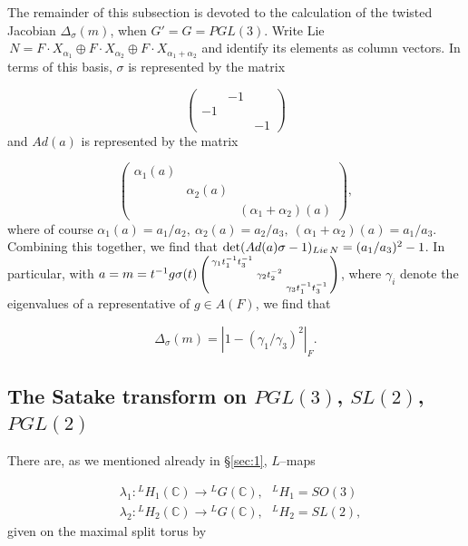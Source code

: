 \documentclass[12pt,letterpaper]{article}
\def\ccc{\mathbb{C}}
\begin{document}
The remainder of this subsection is devoted to the calculation of the
twisted Jacobian $\Delta_{\sigma}(m)$, when $G' = G = PGL(3)$. Write
Lie$\,N = F\cdot X_{\alpha_1}\oplus F\cdot X_{\alpha_2}
\oplus F\cdot X_{\alpha_1+\alpha_2}$ and identify its elements as
column vectors. In terms of this basis, $\sigma$ is represented by
the matrix

\[
\left( 
\begin{array}{ccc} 
\ &-1&\ \\
-1&\ &\ \\
\ &\ &-1
\end{array} 
\right)
\]
and $Ad(a)$ is represented by the matrix

\[
\left( 
\begin{array}{ccc} 
\alpha_1(a)&\ &\ \\
\ &\alpha_2(a)&\ \\
\ &\ &(\alpha_1+\alpha_2)(a)
\end{array} 
\right),
\]
where of course $\alpha_1(a) = a_1/a_2,\ \alpha_2(a) = a_2/a_3,
\ (\alpha_1 +\alpha_2)(a) = a_1/a_3$. Combining this together, we find
that ${\rm det} (Ad(a)\sigma -1)_{Lie\, N}= (a_1/a_3)^2-1$.
In particular, with $a = m = t^{-1}g\sigma (t) \left( \smallmatrix
\gamma_1t_1^{-1}t_3^{-1}&\ &\ \\
\ &\gamma_2t_2^{-2}&\ \\
\ &\ &\gamma_3t_1^{-1}t_3^{-1}\endsmallmatrix\right)$,
where $\gamma_i$ denote the eigenvalues of a representative of $g\in A(F)$,
we find that

\begin{equation}
\label{eqn:2.6}
\Delta_{\sigma}(m) = |1-(\gamma_1/\gamma_3)^2|_F.
\end{equation}

\subsection{The Satake transform on $PGL(3)$, $SL(2)$, $PGL(2)$}
\label{sec:2.3}

There are, as we mentioned already in \S \ref{sec:1}, $L$--maps

\[
\begin{split}
&\lambda_1:{^{L}H_1}(\ccc ) \rightarrow {^{L}G}(\ccc ),
\ \ \ {^{L}H_1} = SO(3)\\
&\lambda_2:{^{L}H_2}(\ccc ) \rightarrow {^{L}G}(\ccc ),
\ \ \ {^{L}H_2} = SL(2),
\end{split}
\]
given on the maximal split torus by
\end{document}
